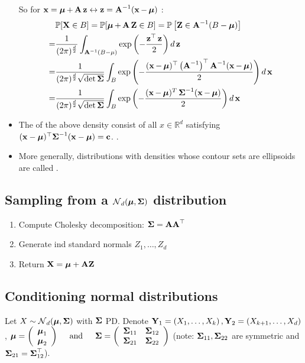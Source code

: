 \begin{itemize}[leftmargin=*]
So for $\x=\mmu+\A \z \leftrightarrow \z=\A^{-1}(\x-\mmu)$ :
$$
\begin{aligned}
& \mathbb{P}[\X \in B]=\mathbb{P}[\mmu+\A \Z \in B]=\mathbb{P}\left[\Z \in \A^{-1}(B-\mmu)\right] \\
=& \frac{1}{(2 \pi)^{\frac{d}{2}}} \int_{\A^{-1}(B-\mu)} \exp \left(-\frac{\z^{\T} \z}{2}\right) d \z \\
=& \frac{1}{(2 \pi)^{\frac{d}{2}} \sqrt{\operatorname{det} \mSigma}} \int_{B} \exp \left(-\frac{(\x-\mmu)^{\T}\left(\A^{-1}\right)^{\T} \A^{-1}(\x-\mmu)}{2}\right) d \x \\
=& \frac{1}{(2 \pi)^{\frac{d}{2}} \sqrt{\operatorname{det} \mSigma}} \int_{B} \exp \left(-\frac{(\x-\mmu)^{T} \mSigma^{-1}(\x-\mmu)}{2}\right) d \x
\end{aligned}
$$
    \item The  of the above density consist of all $x \in \mathbb{R}^{d}$ satisfying $(\vect{x}-\vect{\mu})^{\T} \vect{\Sigma}^{-1}(\vect{x}-\vect{\mu})=\vect{c}$.
 .
    \item More generally, distributions with densities whose contour sets are ellipsoids are called .
\end{itemize}








\subsection*{Sampling from a $\N_{d}(\vect{\mu}, \vect{\Sigma})$ distribution}
\begin{enumerate}[label = (\arabic*), leftmargin=*]
    \item Compute Cholesky decomposition: $\vect{\Sigma}=\vect{AA}^{\T}$
    \item Generate ind standard normals $Z_{1}, \ldots, Z_{d}$
    \item Return $\vect{X}=\vect{\mu}+\vect{A Z}$
\end{enumerate}










\subsection*{Conditioning normal distributions}
Let $X \sim \N_{d}(\vect{\mu}, \vect{\Sigma})$ with $\vect{\Sigma}$ PD.
Denote $\Y_{1}=\left(X_{1}, \ldots, X_{k}\right), \Y_{2}=\left(X_{k+1}, \ldots, X_{d}\right)$,
$
\mmu=\left(\begin{array}{l}
\mmu_{1} \\
\mmu_{2}
\end{array}\right) \quad \text { and } \quad \mSigma=\left(\begin{array}{cc}
\mSigma_{11} & \mSigma_{12} \\
\mSigma_{21} & \mSigma_{22}
\end{array}\right)
$
(note: $\mSigma_{11}, \mSigma_{22}$ are symmetric and $\mSigma_{21}=\mSigma_{12}^{\T}$).

